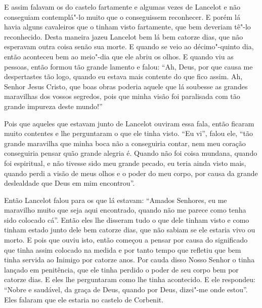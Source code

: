 E assim falavam os do castelo fartamente e algumas vezes de Lancelot e não
conseguiam contemplá"-lo muito que o conseguissem reconhecer. E porém lá havia
alguns cavaleiros que o tinham visto fartamente, que bem deveriam tê"-lo
reconhecido. Desta maneira jazeu Lancelot bem lá bem catorze dias, que não
esperavam outra coisa senão sua morte. E quando se veio ao décimo"-quinto dia,
então aconteceu bem ao meio"-dia que ele abriu os olhos. E quando viu as
pessoas, então formou tão grande lamento e falou: “Ah, Deus, por que causa me
despertastes tão logo, quando eu estava mais contente do que fico assim. Ah,
Senhor Jesus Cristo, que boas obras poderia aquele que lá soubesse as grandes
maravilhas dos vossos segredos, pois que minha visão foi paralisada com tão
grande impureza deste mundo!”

Pois que aqueles que estavam junto de Lancelot ouviram essa fala, então ficaram
muito contentes e lhe perguntaram o que ele tinha visto. “Eu vi”, falou ele,
“tão grande maravilha que minha boca não a conseguiria contar, nem meu coração
conseguiria pensar quão grande alegria é. Quando não foi coisa mundana, quando
foi espiritual, e não tivesse sido meu grande pecado, eu teria ainda visto
mais, quando perdi a visão de meus olhos e o poder do meu corpo, por causa da
grande deslealdade que Deus em mim encontrou”. 

Então Lancelot falou para os que lá estavam: “Amados Senhores, eu me maravilho
muito que seja aqui encontrado, quando não me parece como tenha sido colocado
cá”. Então eles lhe disseram tudo o que dele tinham visto e como tinham estado
junto dele bem catorze dias, que não sabiam se ele estaria vivo ou morto. E
pois que ouviu isto, então começou a pensar por causa do significado que tinha
assim colocado na medida e por tanto tempo que refletiu que bem tinha servida
ao Inimigo por catorze anos. Por cauda disso Nosso Senhor o tinha lançado em
penitência, que ele tinha perdido o poder de seu corpo bem por catorze dias. 
E eles lhe perguntaram como lhe tinha acontecido. E ele respondeu: “Nobre
e saudável, da graça de Deus, quando por Deus, dizei"-me onde estou”. Eles
falaram que ele estaria no castelo de Corbenit. 

